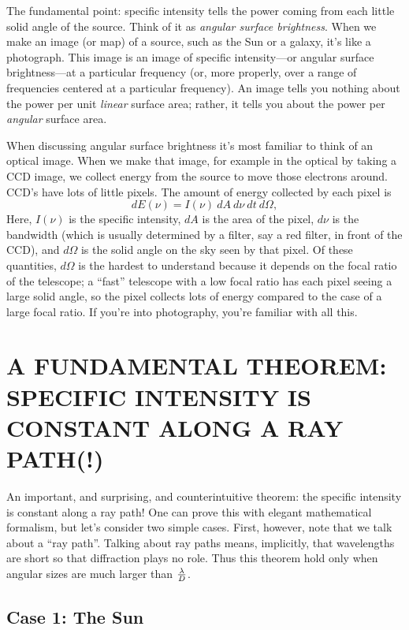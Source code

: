 \documentclass[12pt,psfig,preprint]{aastex}
\begin{document}
	The fundamental point: specific intensity tells the power coming
from each little solid angle of the source. Think of it as {\it  angular
surface brightness}. When we make an image (or map) of a source, such as
the Sun or a galaxy, it's like a photograph. This image is an image of
specific intensity---or  angular surface brightness---at a particular
frequency (or, more properly, over a range of frequencies centered at a
particular frequency). An image tells you nothing about the power per
unit {\it linear} surface area; rather, it tells you about the power per {\it
angular} surface area. 

	When discussing  angular surface brightness it's most familiar
to think of an optical image. When we make that image, for example in
the optical by taking a CCD image, we collect energy from the source to
move those electrons around. CCD's have lots of little pixels. The
amount of energy collected by each pixel is
%
\begin{equation} \label{efromi}
 dE(\nu) = I(\nu)~dA~d\nu~dt~d\Omega,
\end{equation}
%
\noindent Here, $I(\nu)$ is the specific intensity, $dA$ is the area of
the pixel, $d\nu$ is the bandwidth (which is usually determined by a
filter, say a red filter, in front of the CCD), and $d\Omega$ is the
solid angle on the sky seen by that pixel. Of these quantities,
$d\Omega$ is the hardest to understand because it depends on the focal
ratio of the telescope; a ``fast'' telescope with a low focal ratio has
each pixel seeing a large solid angle, so the pixel collects lots of
energy compared to the case of a large focal ratio. If you're into
photography, you're familiar with all this.

\section{A FUNDAMENTAL THEOREM: SPECIFIC INTENSITY IS CONSTANT ALONG
A RAY PATH(!)} \label{theorem}

	An important, and surprising, and counterintuitive theorem: the
specific intensity is constant along a ray path! One can prove this with
elegant mathematical formalism, but let's consider two simple cases. 
First, however, note that we talk about a ``ray path''.  Talking about
ray paths means, implicitly, that wavelengths are short so that
diffraction plays no role.  Thus this theorem hold only when angular
sizes are much larger than $\lambda \over D$. 

\subsection {Case 1: The Sun}
\end{document}
